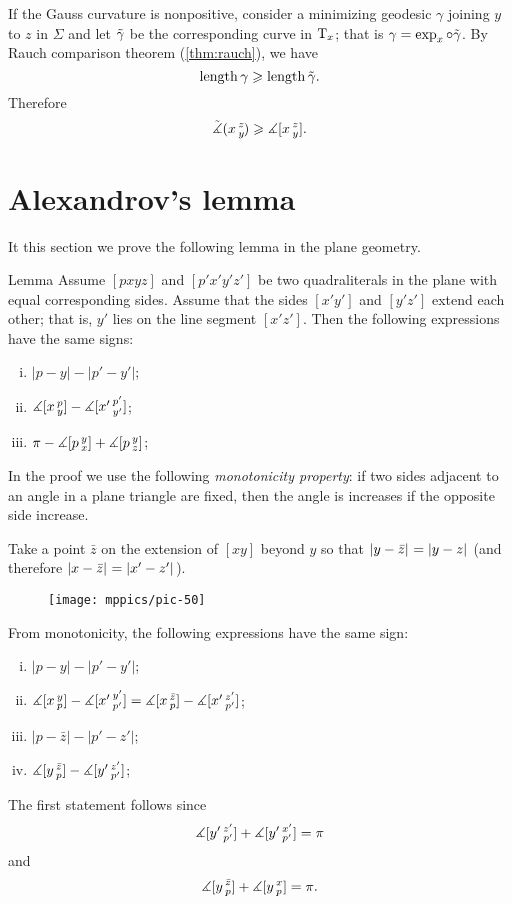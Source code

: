 If the Gauss curvature is nonpositive,
consider a minimizing geodesic $\gamma$ joining $y$ to $z$ in $\Sigma$ and let $\~\gamma$ be the corresponding curve in $\T_x$; that is  $\gamma=\exp_x\circ\~\gamma$.
By Rauch comparison theorem (\ref{thm:rauch}), we have
\[\length\gamma\ge \length \~\gamma.\]
Therefore
\[\angk xzy\ge \measuredangle\hinge xzy.\]
\qedsf

\section{Alexandrov's lemma}

It this section we prove the following lemma in the plane geometry.

\begin{thm}{Lemma}
\label{lem:alex}
Assume $[pxyz]$ and $[p'x'y'z']$ be two quadraliterals in the plane with equal corresponding sides.
Assume that the sides $[x'y']$ and $[y'z']$ extend each other; that is, $y'$ lies on the line segment $[x'z']$.
Then the following expressions have the same signs:
\begin{enumerate}[(i)]
 \item $|p-y|-|p'-y'|$;
 \item $\measuredangle\hinge xpy-\measuredangle\hinge {x'}{p'}{y'}$;
 \item $\pi-\measuredangle\hinge pyx+\measuredangle\hinge pyz$;
\end{enumerate}
\end{thm}

In the proof we use the following \emph{monotonicity property}:
if two sides adjacent to an angle in a plane triangle are fixed, 
then the angle is increases if the opposite side increase.

Take 
a point $\bar z$ on the extension of 
$[xy]$ beyond $y$ so that $\dist{y}{\bar z}{}=\dist{y}{z}{}$ (and therefore $\dist{x}{\bar z}{}=\dist{x'}{z'}{}$). 

\begin{figure}[h!]
\vskip-0mm
\centering
\texttt{[image: mppics/pic-50]}
\vskip-0mm
\end{figure}
 
From monotonicity, 
the following expressions have the same sign:
\begin{enumerate}[(i)]
\item $|p-y|-|p'-y'|$;
\item $\measuredangle\hinge{x}{y}{p}-\measuredangle\hinge{x'}{y'}{p'}=\measuredangle\hinge{x}{\bar z}{p}-\measuredangle\hinge{x'}{z'}{p'}$;
\item $|p-\bar z|-|p'-z'|$;
\item $\measuredangle\hinge{y}{\bar z}{p}-\measuredangle\hinge{y'}{z'}{p'}$;
\end{enumerate}
The first statement follows since
\[\measuredangle\hinge{y'}{z'}{p'}+\measuredangle\hinge{y'}{x'}{p'}=\pi\]
and
\[\measuredangle\hinge{y}{\bar z}{p}+\measuredangle\hinge{y}{x}{p}=\pi.\]
\qedsf

